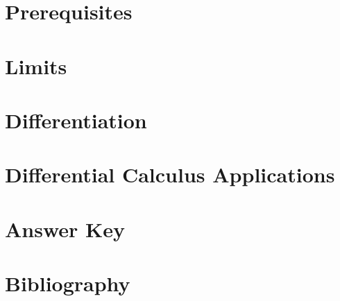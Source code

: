 \documentclass[11pt,fleqn,openany]{book}
\begin{document}
    
    
    
    \part{Prerequisites}
        
        
        
        
    \part{Limits}
        
        
        
        
    \part{Differentiation}
        
        
        
    \part{Differential Calculus Applications}
        
        
        
        
        
    \part*{Answer Key}
        
    \part*{Bibliography}
        
\end{document}
